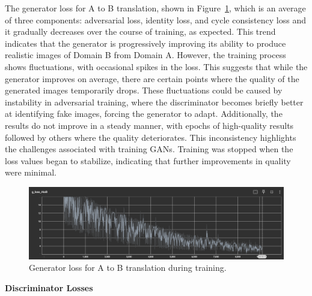 \documentclass[12pt,DIV14,BCOR12mm,a4paper,footinclude=false,headinclude,parskip=half-,twoside,openright,cleardoublepage=empty,toc=index,bibliography=totoc,listof=totoc]{scrreprt}
\numberwithin{equation}{chapter}
\begin{document}
The generator loss for A to B translation, shown in Figure~\ref{g_loss}, which is an average of three components: adversarial loss, identity loss, and cycle consistency loss and it gradually decreases over the course of training, as expected. This trend indicates that the generator is progressively improving its ability to produce realistic images of Domain B from Domain A. However, the training process shows fluctuations, with occasional spikes in the loss. This suggests that while the generator improves on average, there are certain points where the quality of the generated images temporarily drops. These fluctuations could be caused by instability in adversarial training, where the discriminator becomes briefly better at identifying fake images, forcing the generator to adapt. Additionally, the results do not improve in a steady manner, with epochs of high-quality results followed by others where the quality deteriorates. This inconsistency highlights the challenges associated with training GANs. Training was stopped when the loss values began to stabilize, indicating that further improvements in quality were minimal.
\begin{figure}
	\centering
	\includegraphics[scale=.51]{../media/g_loss_atob.png}
	\caption{Generator loss for A to B translation during training.}
	\label{g_loss}
\end{figure}

\textbf{Discriminator Losses}
\end{document}
